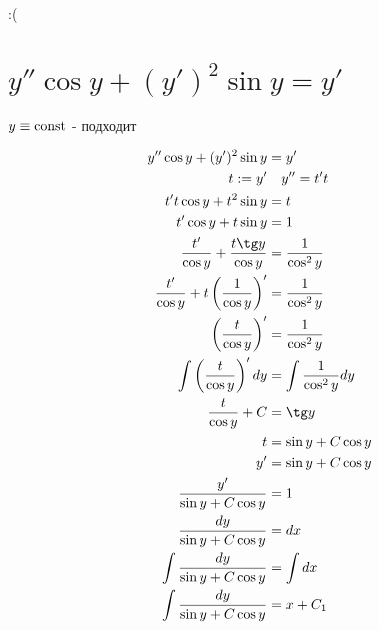 :(

\section{$y''\cos y+(y')^2\sin y=y'$}

$y\equiv\text{const}$ - подходит

\begin{align*}
    y''\cos y+(y')^2\sin y                            & = y'                         \\
    t := y'                                           & \quad y'' = t't              \\
    t't\cos y+t^2\sin y                               & = t                          \\
    t'\cos y+t\sin y                                  & = 1                          \\
    \frac{t'}{\cos y}+\frac{t\tg y}{\cos y}           & = \frac{1}{\cos^2 y}         \\
    \frac{t'}{\cos y}+t\left(\frac{1}{\cos y}\right)' & = \frac{1}{\cos^2 y}         \\
    \left(\frac{t}{\cos y}\right)'                    & = \frac{1}{\cos^2 y}         \\
    \int \left(\frac{t}{\cos y}\right)' dy            & = \int \frac{1}{\cos^2 y} dy \\
    \frac{t}{\cos y} + C                              & = \tg y                      \\
    t                                                 & = \sin y + C\cos y           \\
    y'                                                & = \sin y + C\cos y           \\
    \frac{y'}{\sin y + C\cos y}                       & = 1                          \\
    \frac{dy}{\sin y + C\cos y}                       & = dx                         \\
    \int \frac{dy}{\sin y + C\cos y}                  & = \int dx                    \\
    \int \frac{dy}{\sin y + C\cos y}                  & = x + C_1                    \\
\end{align*}

